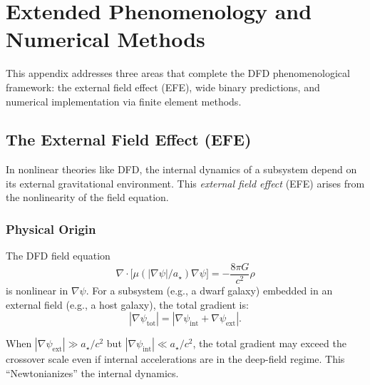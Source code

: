 
\section{Extended Phenomenology and Numerical Methods}\label{app:extended-phenom}

This appendix addresses three areas that complete the DFD phenomenological 
framework: the external field effect (EFE), wide binary predictions, and 
numerical implementation via finite element methods.

\subsection{The External Field Effect (EFE)}\label{app:efe}

In nonlinear theories like DFD, the internal dynamics of a subsystem depend 
on its external gravitational environment. This \emph{external field effect} 
(EFE) arises from the nonlinearity of the field equation.

\subsubsection{Physical Origin}

The DFD field equation
\begin{equation}
\nabla \cdot \bigl[\mu(|\nabla\psi|/a_\star)\nabla\psi\bigr] = -\frac{8\pi G}{c^2}\rho
\end{equation}
is nonlinear in $\nabla\psi$. For a subsystem (e.g., a dwarf galaxy) embedded 
in an external field (e.g., a host galaxy), the total gradient is:
\begin{equation}
|\nabla\psi_{\mathrm{tot}}| = |\nabla\psi_{\mathrm{int}} + \nabla\psi_{\mathrm{ext}}|.
\end{equation}

When $|\nabla\psi_{\mathrm{ext}}| \gg a_\star/c^2$ but $|\nabla\psi_{\mathrm{int}}| \ll a_\star/c^2$, 
the total gradient may exceed the crossover scale even if internal accelerations 
are in the deep-field regime. This ``Newtonianizes'' the internal dynamics.

